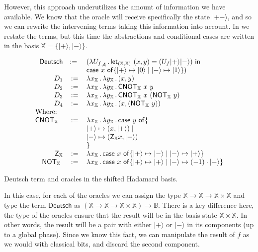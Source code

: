 \documentclass[runningheads,orivec,envcountsame,envcountsect]{llncs}
\newcommand\ket[1]{\ensuremath{|#1\rangle}}
\newcommand\AbsBasis{\ensuremath{\mathcal{A}}}
\def\Pair#1#2{(#1,#2)} %
\def\Lam#1#2#3{\lambda#1_{#2}\,{.}\,#3} %
\def\letkeyword{\mathsf{let}}
\def\inkeyword{\mathsf{in}}
\def\LetP#1#2#3#4#5#6{\letkeyword_{\Pair{#2}{#4}}~\Pair{#1}{#3}=#5~\inkeyword~#6}
\def\case#1#2#3#4#5{\ensuremath{\mathsf{case}~#1~\mathsf{of} \{#2\mapsto #4 \mid #3\mapsto #5\}}}
\newcommand\B{\mathbb B}
\newcommand\XB{\mathbb X}
\newcommand{\pauliZXB}{\mathsf{Z}_{\XB}}
\newcommand{\cnotXB}[2]{\mathsf{CNOT}_{\XB}\ #1\ #2}
\newcommand{\pauliXXB}[1]{\mathsf{NOT}_{\XB}\ #1}
\begin{document}
However, this approach underutilizes the amount of information we have available. We know that the oracle will receive specifically the state $\ket{+-}$, and so we can rewrite the intervening terms taking this information into account. In  we restate the terms, but this time the abstractions and conditional cases are written in the basis $\XB=\{\ket{+},\ket{-}\}$.

\begin{table*}
    \footnotesize
    \[
    \begin{array}{r c l}
        \mathsf{Deutsch}&:=~&(\Lam{{U_f}}{\AbsBasis}{
                \LetP{x}{\XB}{y}{\XB}
                {(U_f \ket{+} \ket{-})}
                {\\ && \case{x}{\ket{+}}{\ket{-}}{\ket{0}}{\ket{1}}}})\\
        D_1 &:= &\Lam{x}{\XB}{\Lam{y}{\XB}{\Pair{x}{y}}}\\
        D_2 &:= &\Lam{x}{\XB}{\Lam{y}{\XB}{\cnotXB{x}{y}}}\\
        D_3 &:= &\Lam{x}{\XB}{\Lam{y}{\XB}{\cnotXB{x}{(\pauliXXB{y})}}}\\
        D_4 &:= &\Lam{x}{\XB}{\Lam{y}{\XB}{\Pair{x}{(\pauliXXB{y})}}}\\
        \multicolumn{3}{l}{\text{Where:}}\\
        \cnotXB{}{} &:=& \Lam{x}{\XB}{\Lam{y}{\XB}{
        \case{y}
        {\\ && \ket{+}}{\\ && \ket{-}}
        {\Pair{x}{\ket{+}}}{\Pair{\pauliZXB{x}}{\ket{-}} \\ &&}}}\\
        \pauliZXB{} &:=& \Lam{x}{\XB}{\case{x}{\ket{+}}{\ket{-}}{\ket{-}}{\ket{+}}}\\
        \pauliXXB{} &:=& \Lam{x}{\XB}{\case{x}{\ket{+}}{\ket{-}}{\ket{+}}{(-1)\cdot \ket{-}}}\\
    \end{array}
    \]
    \caption{Deutsch term and oracles in the shifted Hadamard basis.}
    \label{tab:DeutschShift}
\end{table*}

In this case, for each of the oracles we can assign the type $\XB\to\XB\to\XB\times\XB$ and type the term $\mathsf{Deutsch}$ as $(\XB\to\XB\to\XB\times\XB)\to\B$. There is a key difference here, the type of the oracles ensure that the result will be in the basis state $\XB\times\XB$. In other words, the result will be a pair with either $\ket{+}$ or $\ket{-}$ in its components (up to a global phase). Since we know this fact, we can manipulate the result of $f$ as we would with classical bits, and discard the second component. 
\end{document}
